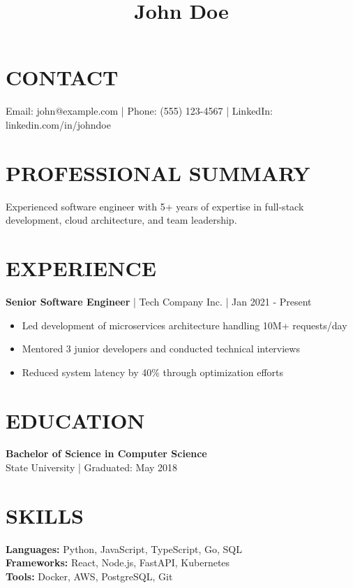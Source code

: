 \documentclass{article}
\title{John Doe}
\author{}
\date{}
\begin{document}
\maketitle

\section*{CONTACT}
Email: john@example.com | Phone: (555) 123-4567 | LinkedIn: linkedin.com/in/johndoe

\section*{PROFESSIONAL SUMMARY}
Experienced software engineer with 5+ years of expertise in full-stack development, cloud architecture, and team leadership.

\section*{EXPERIENCE}

\textbf{Senior Software Engineer} | Tech Company Inc. | Jan 2021 - Present
\begin{itemize}
  \item Led development of microservices architecture handling 10M+ requests/day
  \item Mentored 3 junior developers and conducted technical interviews
  \item Reduced system latency by 40\% through optimization efforts
\end{itemize}

\section*{EDUCATION}

\textbf{Bachelor of Science in Computer Science}\\
State University | Graduated: May 2018

\section*{SKILLS}

\textbf{Languages:} Python, JavaScript, TypeScript, Go, SQL\\
\textbf{Frameworks:} React, Node.js, FastAPI, Kubernetes\\
\textbf{Tools:} Docker, AWS, PostgreSQL, Git
\end{document}
